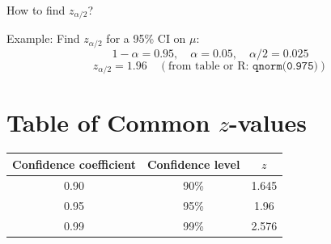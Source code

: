 How to find $z_{\alpha/2}$?

Example: Find $z_{\alpha/2}$ for a 95\% CI on $\mu$:
\[
1 - \alpha = 0.95, \quad \alpha = 0.05, \quad \alpha/2 = 0.025
\]
\[
z_{\alpha/2} = 1.96 \quad (\text{from table or R: } \texttt{qnorm(0.975)})
\]


\section*{Table of Common $z$-values}

\begin{center}
\begin{tabular}{|c|c|c|}
\hline
Confidence coefficient & Confidence level & $z$ \\
\hline
0.90 & 90\% & 1.645 \\
0.95 & 95\% & 1.96 \\
0.99 & 99\% & 2.576 \\
\hline
\end{tabular}
\end{center}



